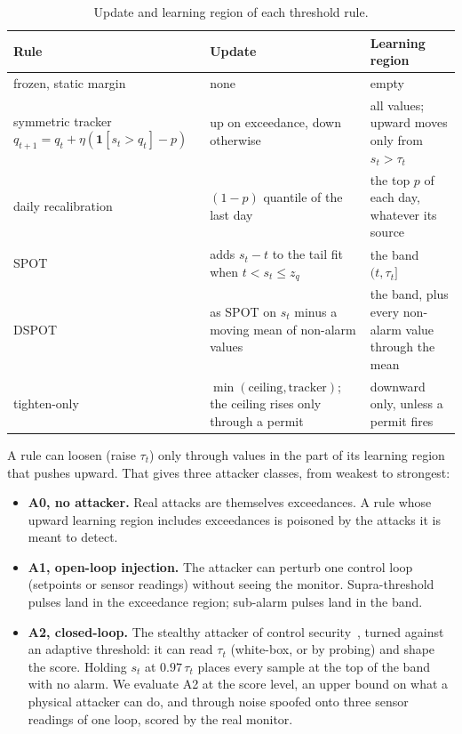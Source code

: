\documentclass[sigconf]{acmart}
\begin{document}
\begin{table}[t]
\caption{Update and learning region of each threshold rule.}
\label{tab:regions}
\begin{tabularx}{\textwidth}{@{}>{\hsize}L>{\hsize}L>{\hsize}L@{}}
\toprule
Rule & Update & Learning region \\
\midrule
frozen, static margin & none & empty \\
symmetric tracker $q_{t+1} = q_t + \eta(\mathbf{1}[s_t > q_t] - p)$ & up on exceedance, down otherwise & all values; upward moves only from $s_t > \tau_t$ \\
daily recalibration & $(1 - p)$ quantile of the last day & the top $p$ of each day, whatever its source \\
SPOT & adds $s_t - t$ to the tail fit when $t < s_t \le z_q$ & the band $(t, \tau_t]$ \\
DSPOT & as SPOT on $s_t$ minus a moving mean of non-alarm values & the band, plus every non-alarm value through the mean \\
tighten-only & $\min(\text{ceiling}, \text{tracker})$; the ceiling rises only through a permit & downward only, unless a permit fires \\
\bottomrule
\end{tabularx}
\end{table}

A rule can loosen (raise $\tau_t$) only through values in the part of its learning region that
pushes upward. That gives three attacker classes, from weakest to strongest:

\begin{itemize}
\item \textbf{A0, no attacker.} Real attacks are themselves exceedances. A rule whose upward
  learning region includes exceedances is poisoned by the attacks it is meant to detect.
\item \textbf{A1, open-loop injection.} The attacker can perturb one control loop (setpoints or
  sensor readings) without seeing the monitor. Supra-threshold pulses land in the exceedance
  region; sub-alarm pulses land in the band.
\item \textbf{A2, closed-loop.} The stealthy attacker of control
  security~\cite{cardenas2011process, urbina2016stealthy}, turned against an adaptive threshold: it can
  read $\tau_t$ (white-box, or by probing) and shape the score. Holding $s_t$ at $0.97\,\tau_t$ places
  every sample at the top of the band with no
  alarm. We evaluate A2 at the score level, an upper bound on what a physical attacker can do, and
  through noise spoofed onto three sensor readings of one loop, scored by the real monitor.
\end{itemize}
\end{document}
